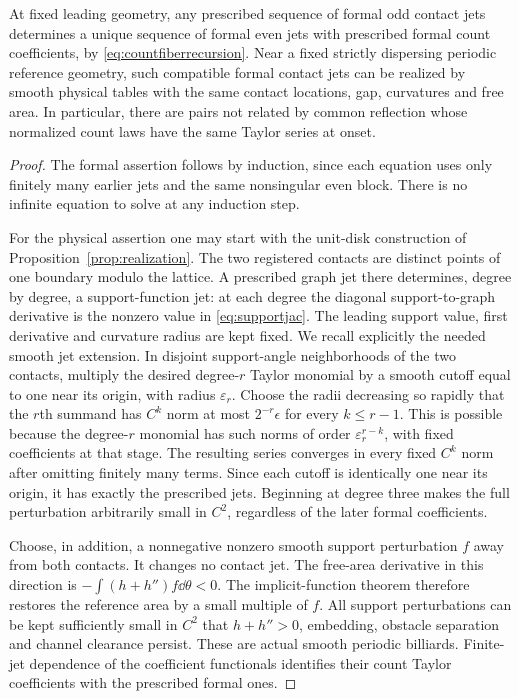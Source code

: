 \begin{proposition}
\label{prop:formalcount}
At fixed leading geometry, any prescribed sequence of formal odd contact
jets determines a unique sequence of formal even jets with prescribed
formal count coefficients, by \eqref{eq:countfiberrecursion}. Near a
fixed strictly dispersing periodic reference geometry, such compatible
formal contact jets can be realized by smooth physical tables with the
same contact locations, gap, curvatures and free area. In particular,
there are pairs not related by common reflection whose normalized count
laws have the same Taylor series at onset.
\end{proposition}
\begin{proof}
The formal assertion follows by induction, since each equation uses only
finitely many earlier jets and the same nonsingular even block. There
is no infinite equation to solve at any induction step.

For the physical assertion one may start with the unit-disk construction
of Proposition~\ref{prop:realization}. The two registered contacts are
distinct points of one boundary modulo the lattice. A prescribed graph
jet there determines, degree by degree, a support-function jet: at each
degree the diagonal support-to-graph derivative is the nonzero value
in \eqref{eq:supportjac}. The leading support value, first derivative
and curvature radius are kept fixed. We recall explicitly the needed
smooth jet extension. In disjoint support-angle neighborhoods of the
two contacts, multiply the desired degree-$r$ Taylor monomial by a
smooth cutoff equal to one near its origin, with radius $\varepsilon_r$.
Choose the radii decreasing so rapidly that the $r$th summand has
$C^k$ norm at most $2^{-r}\epsilon$ for every $k\le r-1$.
This is possible because the degree-$r$ monomial has such norms of
order $\varepsilon_r^{r-k}$, with fixed coefficients at that stage.
The resulting series converges in every fixed $C^k$ norm after omitting
finitely many terms. Since each cutoff is identically one near its
origin, it has exactly the prescribed jets. Beginning at degree three
makes the full perturbation arbitrarily small in $C^2$, regardless of
the later formal coefficients.

Choose, in addition, a nonnegative nonzero smooth support perturbation
$f$ away from both contacts. It changes no contact jet. The free-area
derivative in this direction is
$-\int(h+h'')f\dd\theta<0$. The implicit-function theorem therefore
restores the reference area by a small multiple of $f$. All support
perturbations can be kept sufficiently small in $C^2$ that
$h+h''>0$, embedding, obstacle separation and channel clearance persist.
These are actual smooth periodic billiards. Finite-jet dependence of
the coefficient functionals identifies their count Taylor coefficients
with the prescribed formal ones.


\end{proof}
